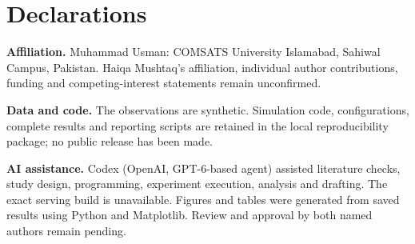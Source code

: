 \section*{Declarations}
\textbf{Affiliation.} Muhammad Usman: COMSATS University Islamabad, Sahiwal Campus, Pakistan. Haiqa Mushtaq's affiliation, individual author contributions, funding and competing-interest statements remain unconfirmed.

\textbf{Data and code.} The observations are synthetic. Simulation code, configurations, complete results and reporting scripts are retained in the local reproducibility package; no public release has been made.

\textbf{AI assistance.} Codex (OpenAI, GPT-6-based agent) assisted literature checks, study design, programming, experiment execution, analysis and drafting. The exact serving build is unavailable. Figures and tables were generated from saved results using Python and Matplotlib. Review and approval by both named authors remain pending.
